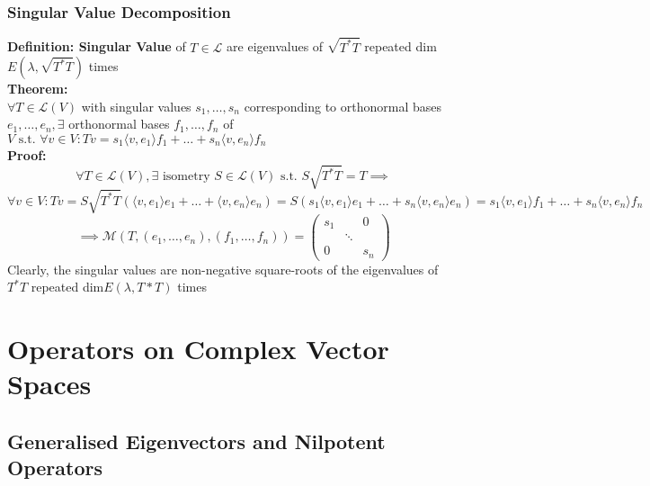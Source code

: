 \documentclass{article}
\newcommand{\st}{\mbox{ s.t. }}
\newcommand{\0}{{\bf{0}}}
\begin{document}
\subsubsection{Singular Value Decomposition}
\textbf{Definition: Singular Value} of $T\in\mathcal{L}$ are eigenvalues of $\sqrt{T^*T}$ repeated dim$E\left(\lambda,\sqrt{T^*T}\right)$ times\\
\textbf{Theorem: }\\
$\forall T\in\mathcal{L}(V)$ with singular values $s_1,\dots,s_n$ corresponding to orthonormal bases $e_1,\dots,e_n,\exists$ orthonormal bases $f_1,\dots,f_n$ of $V\st\forall v\in V:Tv=s_1\langle v,e_1\rangle f_1+\dots+s_n\langle v,e_n\rangle f_n$\\
\textbf{Proof:}
$$\forall T\in\mathcal{L}(V),\exists\mbox{ isometry }S\in\mathcal{L}(V)\st S\sqrt{T^*T}=T\implies$$
$$\forall v\in V:Tv=S\sqrt{T^*T}(\langle v,e_1\rangle e_1+\dots+\langle v,e_n\rangle e_n)=S(s_1\langle v,e_1\rangle e_1+\dots+s_n\langle v,e_n\rangle e_n)=s_1\langle v,e_1\rangle f_1+\dots+s_n\langle v,e_n\rangle f_n$$
$$\implies\mathcal{M}(T,(e_1,\dots,e_n),(f_1,\dots,f_n))=\begin{pmatrix}
    s_1&&0\\
    &\ddots&\\
    0&&s_n
\end{pmatrix}$$
Clearly, the singular values are non-negative square-roots of the eigenvalues of $T^*T$ repeated dim$E(\lambda,T*T)$ times
\clearpage
\section{Operators on Complex Vector Spaces}
\subsection{Generalised Eigenvectors and Nilpotent Operators}
\end{document}

